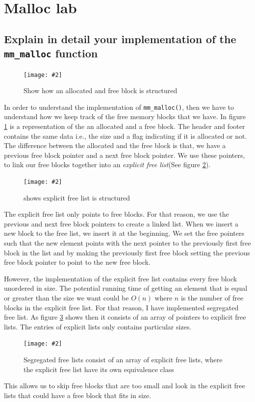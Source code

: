 \documentclass[11pt]{article}
\newcommand{\code}[1]{{\colorbox{lightgray!15}{\color{black}\texttt{#1}}}}
\newcommand{\centeredpic}[4][0.5]{
    \begin{figure}[h]
        \texttt{[image: \#2]}
        \centering
        \caption{#3}
        \label{fig:#4}
    \end{figure}
}
\begin{document}
\section{Malloc lab}
\subsection{Explain in detail your implementation of the \code{mm\_malloc} function}
\centeredpic[0.4]{Allocation blocks.png}{Show how an allocated and free block is structured}{blocks}
In order to understand the implementation of \code{mm\_malloc()}, then we have to understand how we keep track of the free memory blocks that we have.
In figure \ref{fig:blocks} is a representation of the an allocated and a free block. The header and footer contains the same data i.e., the size and a flag indicating if it is allocated or not.
The difference between the allocated and the free block is that, we have a previous free block pointer and a next free block pointer. We use these pointers,
to link our free blocks together into an \textit{explicit free list}(See figure \ref{fig:explicit-list}).
\centeredpic[0.4]{Explicit free list.png}{shows explicit free list is structured}{explicit-list}
The explicit free list only points to free blocks. For that reason, we use the previous and next free block pointers to create a linked list. 
When we insert a new block to the free list, we insert it at the beginning. We set the free pointers such that the new element points with the next pointer to the previously first free block in the list and by making the previously
first free block setting the previous free block pointer to point to the new free block.

However, the implementation of the explicit free list contains every free block unordered in size. The potential running time of getting an
element that is equal or greater than the size we want could be $O(n)$ where $n$ is the number of free blocks in the explicit free list.
For that reason, I have implemented segregated free list. As figure \ref{fig:segregated-list} shows then it consists of an array of pointers to 
explicit free lists. The entries of explicit lists only contains particular sizes. 
\centeredpic[0.3]{Segregated free list.png}{Segregated free lists consist of an array of explicit free lists, where the explicit free list have its own equivalence class}{segregated-list}
This allows us to skip free blocks that are too small and look in the explicit free lists that could have a free block that fits in size.
\end{document}
